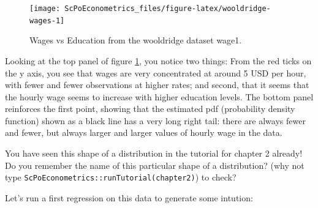 \documentclass[]{book}
\newenvironment{Shaded}{\begin{snugshade}}{\end{snugshade}}
\newcommand{\KeywordTok}[1]{\textcolor[rgb]{0.13,0.29,0.53}{\textbf{#1}}}
\newcommand{\DataTypeTok}[1]{\textcolor[rgb]{0.13,0.29,0.53}{#1}}
\newcommand{\DecValTok}[1]{\textcolor[rgb]{0.00,0.00,0.81}{#1}}
\newcommand{\StringTok}[1]{\textcolor[rgb]{0.31,0.60,0.02}{#1}}
\newcommand{\CommentTok}[1]{\textcolor[rgb]{0.56,0.35,0.01}{\textit{#1}}}
\newcommand{\OtherTok}[1]{\textcolor[rgb]{0.56,0.35,0.01}{#1}}
\newcommand{\OperatorTok}[1]{\textcolor[rgb]{0.81,0.36,0.00}{\textbf{#1}}}
\newcommand{\NormalTok}[1]{#1}
\newenvironment{warning}{\begin{tcolorbox}[colback=orange!5!white,colframe=orange]}{\end{tcolorbox}}
\begin{document}
\begin{Shaded}
\end{Shaded}

\begin{figure}

{\centering \texttt{[image: ScPoEconometrics\_files/figure-latex/wooldridge-wages-1]} 

}

\caption{Wages vs Education from the wooldridge dataset wage1.}\label{fig:wooldridge-wages}
\end{figure}

Looking at the top panel of figure \ref{fig:wooldridge-wages}, you
notice two things: From the red ticks on the y axis, you see that wages
are very concentrated at around 5 USD per hour, with fewer and fewer
observations at higher rates; and second, that it seems that the hourly
wage seems to increase with higher education levels. The bottom panel
reinforces the first point, showing that the estimated pdf (probability
density function) shown as a black line has a very long right tail:
there are always fewer and fewer, but always larger and larger values of
hourly wage in the data.

\begin{warning}
You have seen this shape of a distribution in the tutorial for chapter 2
already! Do you remember the name of this particular shape of a
distribution? (why not type
\texttt{ScPoEconometrics::runTutorial(\textquotesingle{}chapter2\textquotesingle{})})
to check?
\end{warning}

Let's run a first regression on this data to generate some intution:
\end{document}
